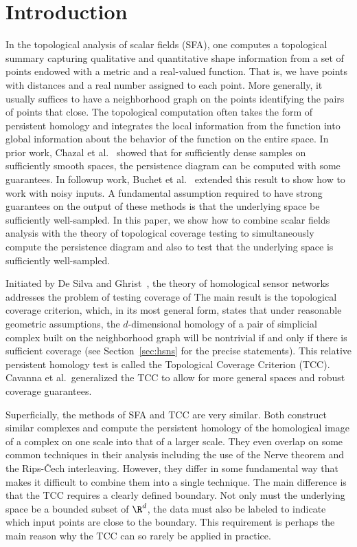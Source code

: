 \section{Introduction}
\label{sec:introduction}

In the topological analysis of scalar fields (SFA), one computes a topological summary capturing qualitative and quantitative shape information from a set of points endowed with a metric and a real-valued function.
That is, we have points with distances and a real number assigned to each point.
More generally, it usually suffices to have a neighborhood graph on the points identifying the pairs of points that close.
The topological computation often takes the form of persistent homology and integrates the local information from the function into global information about the behavior of the function on the entire space.
In prior work, Chazal et al.~\cite{XXX} showed that for sufficiently dense samples on sufficiently smooth spaces, the persistence diagram can be computed with some guarantees.
In followup work, Buchet et al.~\cite{XXX} extended this result to show how to work with noisy inputs.
A fundamental assumption required to have strong guarantees on the output of these methods is that the underlying space be sufficiently well-sampled.
In this paper, we show how to combine scalar fields analysis with the theory of topological coverage testing to simultaneously compute the persistence diagram and also to test that the underlying space is sufficiently well-sampled.

Initiated by De Silva and Ghrist~\cite{XXX,XXX,XXX}, the theory of homological sensor networks addresses the problem of testing coverage of
The main result is the topological coverage criterion, which, in its most general form, states that under reasonable geometric assumptions, the $d$-dimensional homology of a pair of simplicial complex built on the neighborhood graph will be nontrivial if and only if there is sufficient coverage (see Section~\ref{sec:hsns} for the precise statements).
This relative persistent homology test is called the Topological Coverage Criterion (TCC).
Cavanna et al.~generalized the TCC to allow for more general spaces and robust coverage guarantees.

Superficially, the methods of SFA and TCC are very similar.
Both construct similar complexes and compute the persistent homology of the homological image of a complex on one scale into that of a larger scale.
They even overlap on some common techniques in their analysis including the use of the Nerve theorem and the Rips-\v{C}ech interleaving.
However, they differ in some fundamental way that makes it difficult to combine them into a single technique.
The main difference is that the TCC requires a clearly defined boundary.
Not only must the underlying space be a bounded subset of $\R^d$, the data must also be labeled to indicate which input points are close to the boundary.
This requirement is perhaps the main reason why the TCC can so rarely be applied in practice.
